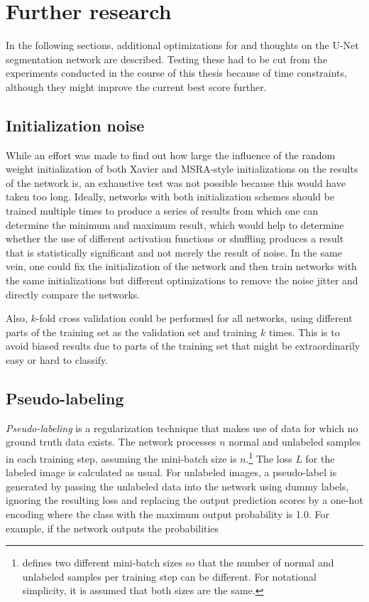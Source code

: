 \chapter {Further research}
\label{chap:futurework}

In the following sections, additional optimizations for and thoughts on the U-Net segmentation network are described. Testing these had to be cut from the experiments conducted in the course of this thesis because of time constraints, although they might improve the current best score further.

\section {Initialization noise}

While an effort was made to find out how large the influence of the random weight initialization of both Xavier and MSRA-style initializations on the results of the network is, an exhaustive test was not possible because this would have taken too long. Ideally, networks with both initialization schemes should be trained multiple times to produce a series of results from which one can determine the minimum and maximum result, which would help to determine whether the use of different activation functions or shuffling produces a result that is statistically significant and not merely the result of noise. In the same vein, one could fix the initialization of the network and then train networks with the same initializations but different optimizations to remove the noise jitter and directly compare the networks.

Also, $k$-fold cross validation could be performed for all networks, using different parts of the training set as the validation set and training $k$ times. This is to avoid biased results due to parts of the training set that might be extraordinarily easy or hard to classify.


	\section {Pseudo-labeling}
\label{subsec:pseudo_label}

\textit{Pseudo-labeling} \cite{pseudo_label} is a regularization technique that makes use of data for which no ground truth data exists. The network processes $n$ normal and unlabeled samples in each training step, assuming the mini-batch size is $n$.\footnote{\cite{pseudo_label} defines two different mini-batch sizes so that the number of normal and unlabeled samples per training step can be different. For notational simplicity, it is assumed that both sizes are the same.} The loss $L$ for the labeled image is calculated as usual. For unlabeled images, a pseudo-label is generated by passing the unlabeled data into the network using dummy labels, ignoring the resulting loss and replacing the output prediction scores by a one-hot encoding where the class with the maximum output probability is 1.0. For example, if the network outputs the probabilities 

